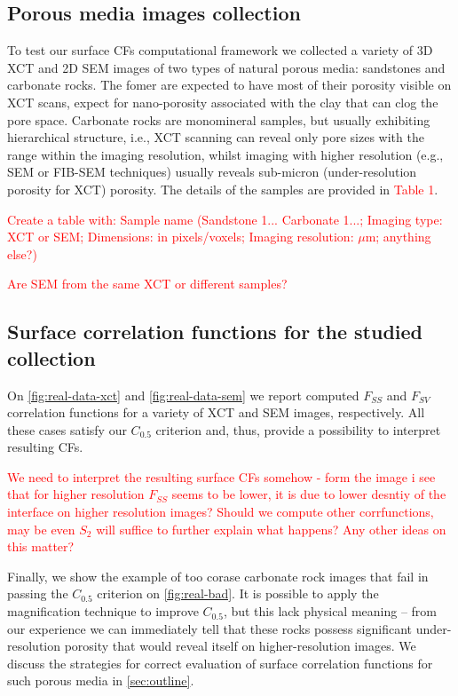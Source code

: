 \documentclass[reprint,amsmath,amssymb,aps,pre,showkeys,showpacs]{revtex4-1}
\begin{document}
\subsection{Porous media images collection}
To test our surface CFs computational framework we collected a variety of 3D XCT
and 2D SEM images of two types of natural porous media: sandstones and carbonate
rocks. The fomer are expected to have most of their porosity visible on XCT
scans, expect for nano-porosity associated with the clay that can clog the pore
space. Carbonate rocks are monomineral samples, but usually exhibiting
hierarchical structure, i.e., XCT scanning can reveal only pore sizes with the
range within the imaging resolution, whilst imaging with higher resolution
(e.g., SEM or FIB-SEM techniques) usually reveals sub-micron (under-resolution
porosity for XCT) porosity. The details of the samples are provided in
\textcolor{red}{Table 1}.

\textcolor{red}{Create a table with: Sample name (Sandstone 1... Carbonate 1...;
  Imaging type: XCT or SEM; Dimensions: in pixels/voxels; Imaging resolution:
  $\mu$m; anything else?)}

\textcolor{red}{Are SEM from the same XCT or different samples?}

\subsection{Surface correlation functions for the studied collection}
On \cref{fig:real-data-xct} and \cref{fig:real-data-sem} we report computed
$F_{SS}$ and $F_{SV}$ correlation functions for a variety of XCT and SEM images,
respectively. All these cases satisfy our $C_{0.5}$ criterion and, thus, provide
a possibility to interpret resulting CFs.

\textcolor{red}{We need to interpret the resulting surface CFs somehow - form
  the image i see that for higher resolution $F_{SS}$ seems to be lower, it is
  due to lower desntiy of the interface on higher resolution images? Should we
  compute other corrfunctions, may be even $S_2$ will suffice to further explain
  what happens? Any other ideas on this matter?}

Finally, we show the example of too corase carbonate rock images that fail in
passing the $C_{0.5}$ criterion on \cref{fig:real-bad}. It is possible to apply
the magnification technique to improve $C_{0.5}$, but this lack physical meaning
-- from our experience we can immediately tell that these rocks possess
significant under-resolution porosity that would reveal itself on
higher-resolution images. We discuss the strategies for correct evaluation of
surface correlation functions for such porous media in \cref{sec:outline}.
\end{document}
